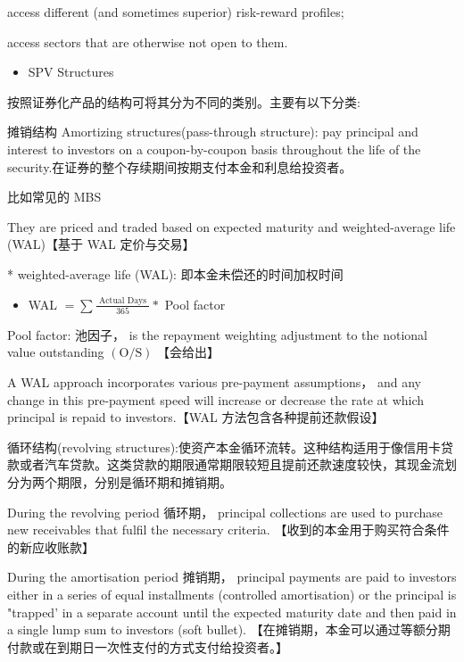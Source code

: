 access different (and sometimes superior) risk-reward profiles;

access sectors that are otherwise not open to them.

\begin{itemize}
\item SPV Structures
\end{itemize}

 按照证券化产品的结构可将其分为不同的类别。主要有以下分类:

摊销结构 Amortizing structures(pass-through structure): pay principal and interest to investors on a coupon-by-coupon basis throughout the life of the security.在证券的整个存续期间按期支付本金和利息给投资者。

比如常见的 MBS

They are priced and traded based on expected maturity and weighted-average life (WAL)【基于 WAL 定价与交易】

* weighted-average life (WAL): 即本金未偿还的时间加权时间

\begin{itemize}
\item WAL \(= \sum \frac{\text{ Actual Days }}{365} *\) Pool factor
\end{itemize}

Pool factor: 池因子， is the repayment weighting adjustment to the notional value outstanding \(\left( {\mathrm{O}/\mathrm{S}}\right)\) 【会给出】

A WAL approach incorporates various pre-payment assumptions， and any change in this pre-payment speed will increase or decrease the rate at which principal is repaid to investors.【WAL 方法包含各种提前还款假设】

循环结构(revolving structures):使资产本金循环流转。这种结构适用于像信用卡贷款或者汽车贷款。这类贷款的期限通常期限较短且提前还款速度较快，其现金流划分为两个期限，分别是循环期和摊销期。

During the revolving period 循环期， principal collections are used to purchase new receivables that fulfil the necessary criteria. 【收到的本金用于购买符合条件的新应收账款】

During the amortisation period 摊销期， principal payments are paid to investors either in a series of equal installments (controlled amortisation) or the principal is "trapped' in a separate account until the expected maturity date and then paid in a single lump sum to investors (soft bullet). 【在摊销期，本金可以通过等额分期付款或在到期日一次性支付的方式支付给投资者。】

